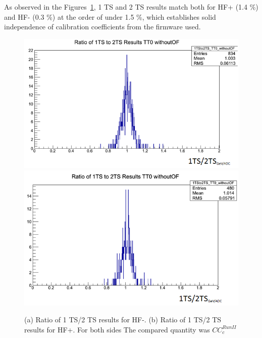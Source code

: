 As observed in the Figures~\ref{fig:HF_1TSto2TS},
1 TS and 2 TS results match both for HF+ (1.4 \%) and HF- (0.3 \%) at the order of under 1.5 \%, which establishes solid independence of calibration coefficients from the firmware used.
\begin{figure}[htb]
  \centering
  \includegraphics[width=0.45\linewidth]{figures/ch_hfcalibration/HFM_1TSto2TS_woOF.png}
  \includegraphics[width=0.45\linewidth]{figures/ch_hfcalibration/HFP_1TSto2TS_woOF.png}
  \caption
        {(a) Ratio of 1 TS/2 TS results for HF-.
         (b) Ratio of 1 TS/2 TS results for HF+.
         For both sides The compared quantity was ${CC}^{Run II}_{c}$}
  \label{fig:HF_1TSto2TS}
\end{figure}

